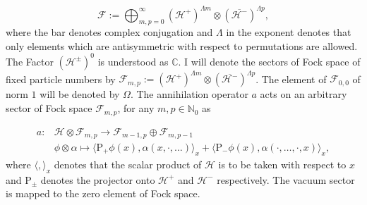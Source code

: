 \documentclass[b5paper,draft,openbib,12pt]{memoir}
\begin{document}
\begin{equation}
\mathcal{F}:=\bigoplus_{m,p=0}^\infty \left(\mathcal{H}^+ \right)^{\Lambda m} \otimes \left(\overline{\mathcal{H}^- }\right)^{\Lambda p},
\end{equation}
where the bar denotes complex conjugation and \(\Lambda\) in the exponent
denotes that only elements which are antisymmetric with respect to permutations
are allowed. The Factor \(\left(\mathcal{H}^{\pm}\right)^0\) is understood as
\(\mathbb{C}\). I will denote the sectors of Fock space of fixed particle
numbers by \(\mathcal{F}_{m,p}:= \left(\mathcal{H}^+ \right)^{\Lambda m}
\otimes \left(\overline{\mathcal{H}^-} \right)^{\Lambda p}\). The element of
\(\mathcal{F}_{0,0}\) of norm \(1\) will be denoted by \(\Omega\).  The
annihilation operator \(a\) acts on an arbitrary sector of Fock space
\(\mathcal{F}_{m,p}\), for any \(m,p\in\mathbb{N}_0\) as

\begin{equation}
\begin{aligned}
a: &\mathcal{H}\otimes \mathcal{F}_{m,p} \rightarrow \mathcal{F}_{m-1,p}\oplus \mathcal{F}_{m,p-1}\\
&\phi \otimes \alpha \mapsto \langle \mathrm{P}_+ \phi (x),\alpha (x,\cdot,\dots)\rangle_x + \langle \mathrm{P}_- \phi (x),\alpha (\cdot,\dots, \cdot, x)\rangle_x,
\end{aligned}
\end{equation}
where \(\langle, \rangle_x\) denotes that the scalar product of \(\mathcal{H}\) is to be taken with respect to \(x\) and \(\mathrm{P}_{\pm}\) denotes the projector onto \(\mathcal{H}^+\) and \(\mathcal{H}^-\) respectively. The vacuum sector is mapped to the zero element of Fock space. 
\end{document}
